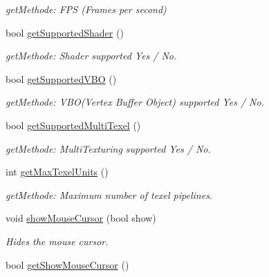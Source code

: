 \begin{DoxyCompactItemize}
\begin{DoxyCompactList}\small\item\em getMethode: FPS (Frames per second) \item\end{DoxyCompactList}\item 
\hypertarget{class_f2_c_1_1_window_a934f936cbcc889d76f819aa43cbb5309}{
bool \hyperlink{class_f2_c_1_1_window_a934f936cbcc889d76f819aa43cbb5309}{getSupportedShader} ()}
\label{class_f2_c_1_1_window_a934f936cbcc889d76f819aa43cbb5309}

\begin{DoxyCompactList}\small\item\em getMethode: Shader supported Yes / No. \item\end{DoxyCompactList}\item 
\hypertarget{class_f2_c_1_1_window_ad702341dc3a8245fc5bd0d5579c5424b}{
bool \hyperlink{class_f2_c_1_1_window_ad702341dc3a8245fc5bd0d5579c5424b}{getSupportedVBO} ()}
\label{class_f2_c_1_1_window_ad702341dc3a8245fc5bd0d5579c5424b}

\begin{DoxyCompactList}\small\item\em getMethode: VBO(Vertex Buffer Object) supported Yes / No. \item\end{DoxyCompactList}\item 
\hypertarget{class_f2_c_1_1_window_a930c473b6416815b98e9e90206119968}{
bool \hyperlink{class_f2_c_1_1_window_a930c473b6416815b98e9e90206119968}{getSupportedMultiTexel} ()}
\label{class_f2_c_1_1_window_a930c473b6416815b98e9e90206119968}

\begin{DoxyCompactList}\small\item\em getMethode: MultiTexturing supported Yes / No. \item\end{DoxyCompactList}\item 
\hypertarget{class_f2_c_1_1_window_a16ac41a8c7fcbff1532b1c3106d4f5cd}{
int \hyperlink{class_f2_c_1_1_window_a16ac41a8c7fcbff1532b1c3106d4f5cd}{getMaxTexelUnits} ()}
\label{class_f2_c_1_1_window_a16ac41a8c7fcbff1532b1c3106d4f5cd}

\begin{DoxyCompactList}\small\item\em getMethode: Maximum number of texel pipelines. \item\end{DoxyCompactList}\item 
void \hyperlink{class_f2_c_1_1_window_af37f6f9549c2fc79b3421bccbb1c5bcd}{showMouseCursor} (bool show)
\begin{DoxyCompactList}\small\item\em Hides the mouse cursor. \item\end{DoxyCompactList}\item 
\hypertarget{class_f2_c_1_1_window_a0a85fa333c5a74f37fb98d302ee157b1}{
bool \hyperlink{class_f2_c_1_1_window_a0a85fa333c5a74f37fb98d302ee157b1}{getShowMouseCursor} ()}
\label{class_f2_c_1_1_window_a0a85fa333c5a74f37fb98d302ee157b1}


\end{DoxyCompactItemize}
